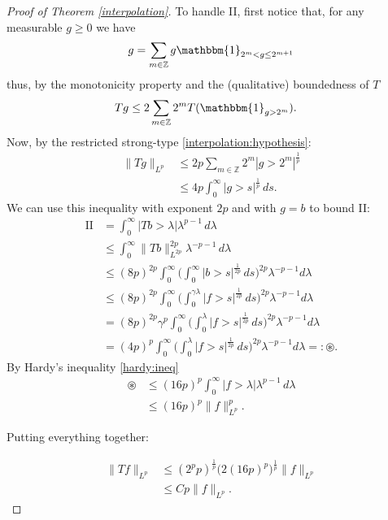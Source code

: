 \documentclass[oneside]{amsart}
\theoremstyle{definition}
\theoremstyle{plain}
\numberwithin{equation}{section}
\numberwithin{theorem}{section}
\newcommand{\ind}{\mathbbm{1}}
\begin{document}
\begin{proof}[Proof of Theorem \ref{interpolation}]
  To handle II, first notice that, for any measurable $g \geq 0$ we have
  \begin{align*}
    g = \sum_{m \in \mathbb{Z}} g \ind_{2^m < g \leq 2^{m+1}}
  \end{align*}
  thus, by the monotonicity property and the (qualitative) boundedness of $T$
  \begin{align*}
    Tg &\leq 2 \sum_{m \in \mathbb{Z}} 2^m T(\ind_{g > 2^m}).
  \end{align*}
  Now, by the restricted strong-type \eqref{interpolation:hypothesis}:
  \begin{align*}
    \|Tg\|_{L^p} &\leq 2p \sum_{m \in \mathbb{Z}} 2^m |g > 2^m|^{\frac{1}{p}} \\
    &\leq 4p \int_0^\infty |g > s|^{\frac{1}{p}} \, ds.
  \end{align*}
  We can use this inequality with exponent $2p$ and with $g = b$ to bound II:
  \begin{align*}
    \text{II} &= \int_0^\infty |Tb > \lambda| \lambda^{p-1} \, d\lambda \\
    &\leq \int_0^\infty \|Tb\|_{L^{2p}}^{2p} \lambda^{-p-1} \, d\lambda \\
    &\leq (8p)^{2p} \int_0^\infty \bigg(
      \int_0^\infty |b > s|^{\frac{1}{2p}} \, ds
    \bigg)^{2p}
    \lambda^{-p-1}d\lambda \\
    &\leq (8p)^{2p} \int_0^\infty \bigg(
      \int_0^{\gamma \lambda} |f > s|^{\frac{1}{2p}} \, ds
    \bigg)^{2p}
    \lambda^{-p-1}d\lambda \\
    &= (8p)^{2p} \gamma^p \int_0^\infty \bigg(
      \int_0^{\lambda} |f > s|^{\frac{1}{2p}} \, ds
    \bigg)^{2p}
    \lambda^{-p-1}d\lambda \\
    &= (4p)^p \int_0^\infty \bigg(
      \int_0^{\lambda} |f > s|^{\frac{1}{2p}} \, ds
    \bigg)^{2p}
    \lambda^{-p-1}d\lambda
    =: \circledast.
  \end{align*}
  By Hardy's inequality \eqref{hardy:ineq}
  \begin{align*}
    \circledast &\leq (16p)^p \int_0^\infty
    |f > \lambda| \lambda^{p-1} \, d\lambda \\
    &\leq (16p)^p \|f\|_{L^p}^p.
  \end{align*}

  Putting everything together:

  \begin{align*}
    \|Tf\|_{L^p} &\leq (2^p p)^{\frac{1}{p}} \big(2(16p)^p\big)^{\frac{1}{p}}
    \|f\|_{L^p} \\
    &\leq Cp \|f\|_{L^p}.
  \end{align*}
\end{proof}



\end{document}
